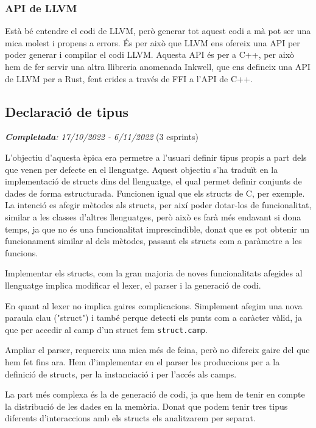 ﻿\documentclass{article}
\begin{document}
\subsubsection{API de LLVM}
Està bé entendre el codi de LLVM, però generar tot aquest codi a mà pot ser una
mica molest i propens a errors. És per això que LLVM ens ofereix una API per
poder generar i compilar el codi LLVM. Aquesta API és per a C++, per això hem de 
fer servir una altra llibreria anomenada Inkwell, que ens defineix una API de 
LLVM per a Rust, fent crides a través de FFI a l'API de C++.


\subsection{Declaració de tipus}
\textit{\textbf{Completada}: 17/10/2022 - 6/11/2022} (3 esprints)

L'objectiu d'aquesta èpica era permetre a l'usuari definir tipus propis a part
dels que venen per defecte en el llenguatge. Aquest objectiu s'ha traduït en la
implementació de structs dins del llenguatge, el qual permet definir conjunts de
dades de forma estructurada. Funcionen igual que els structs de C, per exemple.
La intenció es afegir mètodes als structs, per així poder dotar-los de
funcionalitat, similar a les classes d'altres llenguatges, però això es farà més
endavant si dona temps, ja que no és una funcionalitat imprescindible, donat que
es pot obtenir un funcionament similar al dels mètodes, passant els structs com
a paràmetre a les funcions.

Implementar els structs, com la gran majoria de noves funcionalitats afegides al
llenguatge implica modificar el lexer, el parser i la generació de codi. 

En quant al lexer no implica gaires complicacions. Simplement afegim una nova
paraula clau ("struct") i també perque detecti els punts com a caràcter vàlid,
ja que per accedir al camp d'un struct fem \texttt{struct.camp}.

Ampliar el parser, requereix una mica més de feina, però no difereix gaire del
que hem fet fins ara. Hem d'implementar en el parser les produccions per a la
definició de structs, per la instanciació i per l'accés als camps.

La part més complexa és la de generació de codi, ja que hem de tenir en compte
la distribució de les dades en la memòria. Donat que podem tenir tres tipus
diferents d'interaccions amb els structs els analitzarem per separat.
\end{document}
